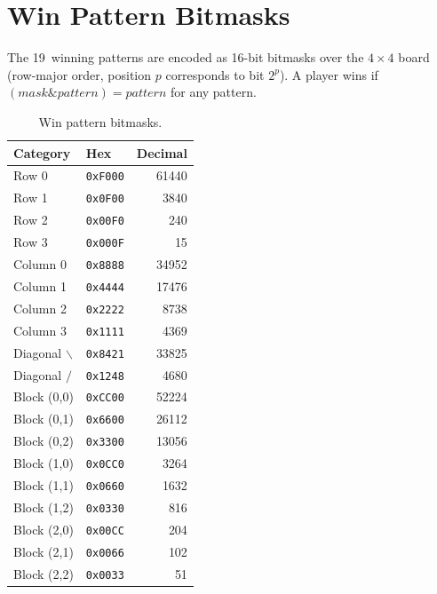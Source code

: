 \documentclass[11pt,a4paper]{article}
\begin{document}
\appendix

\section{Win Pattern Bitmasks}\label{app:patterns}

The 19~winning patterns are encoded as 16-bit bitmasks over the $4{\times}4$
board (row-major order, position $p$ corresponds to bit $2^{p}$).  A player
wins if $(\mathit{mask} \mathbin{\&} \mathit{pattern}) = \mathit{pattern}$
for any pattern.

\begin{table}[ht]
\centering
\caption{Win pattern bitmasks.}
\begin{tabular}{@{}llr@{}}
\toprule
Category & Hex & Decimal\\
\midrule
Row 0       & \texttt{0xF000} & 61440\\
Row 1       & \texttt{0x0F00} & 3840\\
Row 2       & \texttt{0x00F0} & 240\\
Row 3       & \texttt{0x000F} & 15\\
\midrule
Column 0    & \texttt{0x8888} & 34952\\
Column 1    & \texttt{0x4444} & 17476\\
Column 2    & \texttt{0x2222} & 8738\\
Column 3    & \texttt{0x1111} & 4369\\
\midrule
Diagonal $\backslash$ & \texttt{0x8421} & 33825\\
Diagonal $/$ & \texttt{0x1248} & 4680\\
\midrule
Block (0,0) & \texttt{0xCC00} & 52224\\
Block (0,1) & \texttt{0x6600} & 26112\\
Block (0,2) & \texttt{0x3300} & 13056\\
Block (1,0) & \texttt{0x0CC0} & 3264\\
Block (1,1) & \texttt{0x0660} & 1632\\
Block (1,2) & \texttt{0x0330} & 816\\
Block (2,0) & \texttt{0x00CC} & 204\\
Block (2,1) & \texttt{0x0066} & 102\\
Block (2,2) & \texttt{0x0033} & 51\\
\bottomrule
\end{tabular}
\end{table}
\end{document}
